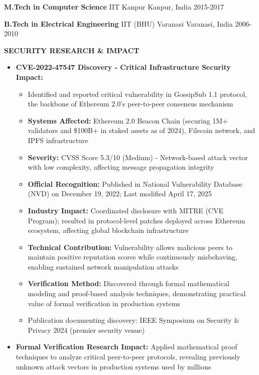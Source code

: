 \documentclass[11pt,letterpaper]{article}
\newcommand{\cvsection}[1]{
    \vspace{0.6em}
    {\color{darkblue}\textbf{\Large #1}}
    \vspace{0.15em}
    \textcolor{lightblue}{\hrulefill}
    \vspace{0.4em}
}
\begin{document}
\textbf{M.Tech in Computer Science} \textcolor{mediumgray}{\textbullet} IIT Kanpur \textcolor{mediumgray}{\textbullet} Kanpur, India \textcolor{mediumgray}{\textbullet} 2015-2017

\textbf{B.Tech in Electrical Engineering} \textcolor{mediumgray}{\textbullet} IIT (BHU) Varanasi \textcolor{mediumgray}{\textbullet} Varanasi, India \textcolor{mediumgray}{\textbullet} 2006-2010

\cvsection{SECURITY RESEARCH \& IMPACT}
\begin{itemize}
    \item \textbf{CVE-2022-47547 Discovery - Critical Infrastructure Security Impact:}
          \begin{itemize}
              \item Identified and reported critical vulnerability in GossipSub 1.1 protocol, the backbone of Ethereum 2.0's peer-to-peer consensus mechanism
              \item \textbf{Systems Affected:} Ethereum 2.0 Beacon Chain (securing 1M+ validators and \$100B+ in staked assets as of 2024), Filecoin network, and IPFS infrastructure
              \item \textbf{Severity:} CVSS Score 5.3/10 (Medium) - Network-based attack vector with low complexity, affecting message propagation integrity
              \item \textbf{Official Recognition:} Published in National Vulnerability Database (NVD) on December 19, 2022; Last modified April 17, 2025
              \item \textbf{Industry Impact:} Coordinated disclosure with MITRE (CVE Program); resulted in protocol-level patches deployed across Ethereum ecosystem, affecting global blockchain infrastructure
              \item \textbf{Technical Contribution:} Vulnerability allows malicious peers to maintain positive reputation scores while continuously misbehaving, enabling sustained network manipulation attacks
              \item \textbf{Verification Method:} Discovered through formal mathematical modeling and proof-based analysis techniques, demonstrating practical value of formal verification in production systems
              \item Publication documenting discovery: IEEE Symposium on Security \& Privacy 2024 (premier security venue)
          \end{itemize}
    \item \textbf{Formal Verification Research Impact:} Applied mathematical proof techniques to analyze critical peer-to-peer protocols, revealing previously unknown attack vectors in production systems used by millions

\end{itemize}
\end{document}
